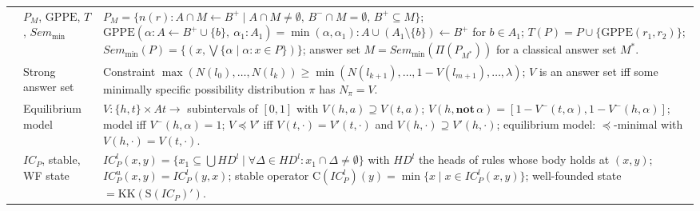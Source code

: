 {\begin{longtable}{@{}p{}p{}p{}@{}}
            \cite{NievesOC13}                                                                        & $P_M$, $\mathrm{GPPE}$, $T$, $\mathit{Sem}_{\min}$       & $P_M=\{n(r):A\cap M\leftarrow B^+\mid A\cap M\neq\emptyset,\,B^-\cap M=\emptyset,\,B^+\subseteq M\}$; $\mathrm{GPPE}(\alpha:A\leftarrow B^+\cup\{b\},\ \alpha_1:A_1)=\min(\alpha,\alpha_1):A\cup(A_1\setminus\{b\})\leftarrow B^+$ for $b\in A_1$; $T(P)=P\cup\{\mathrm{GPPE}(r_1,r_2)\}$; $\mathit{Sem}_{\min}(P)=\{(x,\bigvee\{\alpha\mid\alpha:x\in P\})\}$; answer set $M=\mathit{Sem}_{\min}(\Pi(P_{M^*}))$ for a classical answer set $M^*$.                                \\
            \cite{BautersSDV14tplp}                                                                  & Strong answer set                                        & Constraint $\max(N(l_0),\dots,N(l_k))\geq\min(N(l_{k+1}),\dots,1-V(l_{m+1}),\dots,\lambda)$; $V$ is an answer set iff some minimally specific possibility distribution $\pi$ has $N_\pi=V$.                                                                                                                                                                                                                                                                                       \\
            \cite{SchockaertJV12}                                                                    & Equilibrium model                                        & $V:\{h,t\}\times\mathit{At}\to$ subintervals of $[0,1]$ with $V(h,a)\supseteq V(t,a)$; $V(h,\mathbf{not}\,\alpha)=[1-V^-(t,\alpha),1-V^-(h,\alpha)]$; model iff $V^-(h,\alpha)=1$; $V\preceq V'$ iff $V(t,\cdot)=V'(t,\cdot)$ and $V(h,\cdot)\supseteq V'(h,\cdot)$; equilibrium model: $\preceq$-minimal with $V(h,\cdot)=V(t,\cdot)$.                                                                                                                                           \\
            \cite{HeyninckAB22arxiv}                                                                 & $\mathit{IC}_P$, stable, WF state                        & $\mathit{IC}^l_P(x,y)=\{x_1\subseteq\bigcup HD^l\mid\forall\Delta\in HD^l\colon x_1\cap\Delta\neq\emptyset\}$ with $HD^l$ the heads of rules whose body holds at $(x,y)$; $\mathit{IC}^u_P(x,y)=\mathit{IC}^l_P(y,x)$; stable operator $\mathrm{C}(\mathit{IC}^l_P)(y)=\min\{x\mid x\in\mathit{IC}^l_P(x,y)\}$; well-founded state $=\mathrm{KK}(\mathrm{S}(\mathit{IC}_P)')$.                                                                                                    \\

\end{longtable}}
